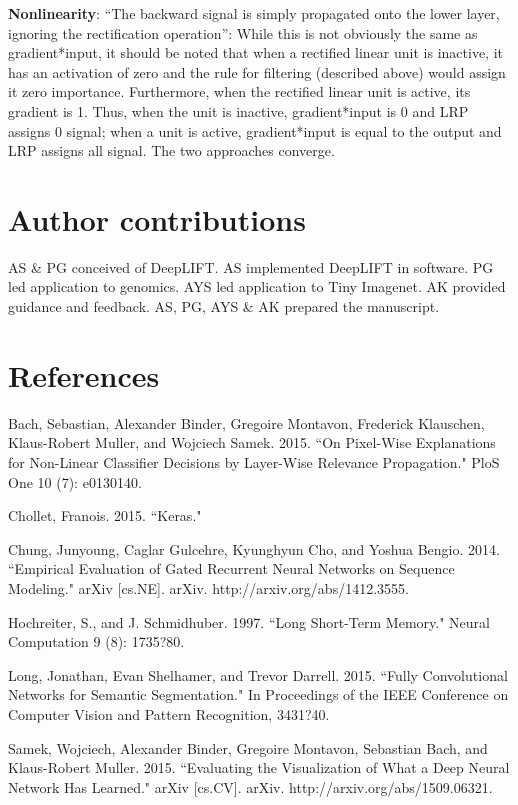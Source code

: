 \documentclass{article}
\begin{document}
{\bf Nonlinearity}: ``The backward signal is simply propagated onto the lower layer, ignoring the rectification operation'': While this is not obviously the same as gradient*input, it should be noted that when a rectified linear unit is inactive, it has an activation of zero and the rule for filtering (described above) would assign it zero importance. Furthermore, when the rectified linear unit is active, its gradient is 1. Thus, when the unit is inactive, gradient*input is 0 and LRP assigns 0 signal; when a unit is active, gradient*input is equal to the output and LRP assigns all signal. The two approaches converge.

\section{Author contributions}

AS \& PG conceived of DeepLIFT. AS implemented DeepLIFT in software. PG led application to genomics. AYS led application to Tiny Imagenet. AK provided guidance and feedback. AS, PG, AYS \& AK prepared the manuscript.

\nocite{*}



\section{References}

Bach, Sebastian, Alexander Binder, Gregoire Montavon, Frederick Klauschen, Klaus-Robert Muller, and Wojciech Samek. 2015. ``On Pixel-Wise Explanations for Non-Linear Classifier Decisions by Layer-Wise Relevance Propagation." PloS One 10 (7): e0130140.

Chollet, Franois. 2015. ``Keras."

Chung, Junyoung, Caglar Gulcehre, Kyunghyun Cho, and Yoshua Bengio. 2014. ``Empirical Evaluation of Gated Recurrent Neural Networks on Sequence Modeling." arXiv [cs.NE]. arXiv. http://arxiv.org/abs/1412.3555.

Hochreiter, S., and J. Schmidhuber. 1997. ``Long Short-Term Memory." Neural Computation 9 (8): 1735?80.

Long, Jonathan, Evan Shelhamer, and Trevor Darrell. 2015. ``Fully Convolutional Networks for Semantic Segmentation." In Proceedings of the IEEE Conference on Computer Vision and Pattern Recognition, 3431?40.

Samek, Wojciech, Alexander Binder, Gregoire Montavon, Sebastian Bach, and Klaus-Robert Muller. 2015. ``Evaluating the Visualization of What a Deep Neural Network Has Learned." arXiv [cs.CV]. arXiv. http://arxiv.org/abs/1509.06321.
\end{document}
